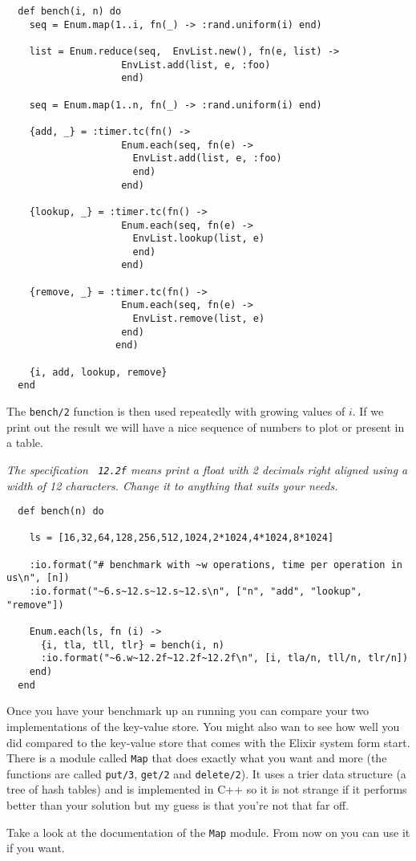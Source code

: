 \documentclass[a4paper,11pt]{article}
\begin{document}
\begin{verbatim}
  def bench(i, n) do 				    
    seq = Enum.map(1..i, fn(_) -> :rand.uniform(i) end)

    list = Enum.reduce(seq,  EnvList.new(), fn(e, list) -> 
                    EnvList.add(list, e, :foo) 
                    end)

    seq = Enum.map(1..n, fn(_) -> :rand.uniform(i) end)
    
    {add, _} = :timer.tc(fn() ->
                    Enum.each(seq, fn(e) -> 
                      EnvList.add(list, e, :foo) 
                      end) 
                    end)

    {lookup, _} = :timer.tc(fn() -> 
                    Enum.each(seq, fn(e) ->
                      EnvList.lookup(list, e) 
                      end) 
                    end) 
    
    {remove, _} = :timer.tc(fn() -> 
                    Enum.each(seq, fn(e) -> 
                      EnvList.remove(list, e) 
                    end) 
                   end) 

    {i, add, lookup, remove}
  end
\end{verbatim}

The {\tt bench/2} function is then used repeatedly with growing values
of $i$. If we print out the result we will have a nice sequence of
numbers to plot or present in a table.

{\em The specification {\tt ~12.2f} means print a float with 2
  decimals right aligned using a width of 12 characters. Change it to
  anything that suits your needs.}

\begin{verbatim}
  def bench(n) do

    ls = [16,32,64,128,256,512,1024,2*1024,4*1024,8*1024]        

    :io.format("# benchmark with ~w operations, time per operation in us\n", [n])
    :io.format("~6.s~12.s~12.s~12.s\n", ["n", "add", "lookup", "remove"])

    Enum.each(ls, fn (i) ->
      {i, tla, tll, tlr} = bench(i, n)
      :io.format("~6.w~12.2f~12.2f~12.2f\n", [i, tla/n, tll/n, tlr/n])
    end)
  end
\end{verbatim}

Once you have your benchmark up an running you can compare your two
implementations of the key-value store. You might also wan to see how
well you did compared to the key-value store that comes with the
Elixir system form start. There is a module called {\tt Map} that does
exactly what you want and more (the functions are called {\tt put/3},
{\tt get/2} and {\tt delete/2}). It uses a trier data structure (a
tree of hash tables) and is implemented in C++ so it is not strange if
it performs better than your solution but my guess is that you're not
that far off.

Take a look at the documentation of the {\tt Map} module. From now on
you can use it if you want. 
\end{document}
